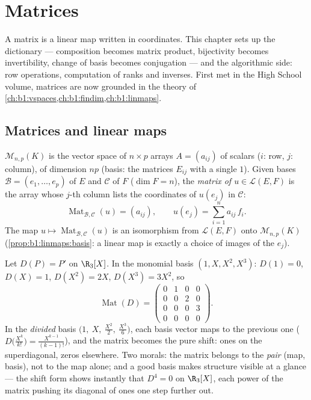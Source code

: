 \chapter{Matrices}\label{ch:b1:matrices}

A matrix is a linear map written in coordinates. This chapter sets
up the dictionary --- composition becomes matrix product, bijectivity
becomes invertibility, change of basis becomes conjugation --- and
the algorithmic side: row operations, computation of ranks and
inverses. First met in the High School volume, matrices are now
grounded in the theory of
\cref{ch:b1:vspaces,ch:b1:findim,ch:b1:linmaps}.

\section{Matrices and linear maps}

\begin{definition}\label{def:b1:matrices:def}
$\mathcal{M}_{n,p}(K)$ is the vector space of $n \times p$ arrays $A
= (a_{ij})$ of scalars ($i$: row, $j$: column), of dimension $np$
(basis: the matrices $E_{ij}$ with a single $1$). Given bases
$\mathcal{B} = (e_1, \dots, e_p)$ of $E$ and $\mathcal{C}$ of $F$
($\dim F = n$), the \emph{matrix of $u \in \mathcal{L}(E, F)$} is
the array whose $j$-th column lists the coordinates of $u(e_j)$ in
$\mathcal{C}$:
\[
\operatorname{Mat}_{\mathcal{B},\mathcal{C}}(u) = (a_{ij}),
\qquad u(e_j) = \sum_{i=1}^{n} a_{ij}\, f_i .
\]
The map $u \mapsto \operatorname{Mat}_{\mathcal{B},\mathcal{C}}(u)$
is an isomorphism from $\mathcal{L}(E, F)$ onto
$\mathcal{M}_{n,p}(K)$ (\cref{prop:b1:linmaps:basis}: a linear map
is exactly a choice of images of the $e_j$).
\end{definition}

\begin{example}
\label{ex:b1:matrices:derivative}
Let $D(P) = P'$ on $\R_3[X]$. In the monomial basis $(1, X, X^2,
X^3)$: $D(1) = 0$, $D(X) = 1$, $D(X^2) = 2X$, $D(X^3) = 3X^2$, so
\[
\operatorname{Mat}(D) =
\begin{pmatrix}
0 & 1 & 0 & 0\\
0 & 0 & 2 & 0\\
0 & 0 & 0 & 3\\
0 & 0 & 0 & 0
\end{pmatrix}.
\]
In the \emph{divided} basis $\bigl(1,\ X,\ \frac{X^2}2,\
\frac{X^3}6\bigr)$, each basis vector maps to the previous one
($D\bigl(\frac{X^k}{k!}\bigr) = \frac{X^{k-1}}{(k-1)!}$), and the
matrix becomes the pure shift: ones on the superdiagonal, zeros
elsewhere. Two morals: the matrix belongs to the \emph{pair}
(map, basis), not to the map alone; and a good basis makes
structure visible at a glance --- the shift form shows instantly
that $D^4 = 0$ on $\R_3[X]$, each power of the matrix pushing its
diagonal of ones one step further out.
\end{example}

